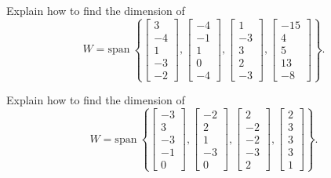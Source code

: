 \documentclass{article}
\begin{document}
\begin{exerciseStatement}
    Explain how to find the dimension of
\[W=\mathrm{span}\ \left\{\left[\begin{array}{r}
3 \\
-4 \\
1 \\
-3 \\
-2
\end{array}\right] , \left[\begin{array}{r}
-4 \\
-1 \\
1 \\
0 \\
-4
\end{array}\right] , \left[\begin{array}{r}
1 \\
-3 \\
3 \\
2 \\
-3
\end{array}\right] , \left[\begin{array}{r}
-15 \\
4 \\
5 \\
13 \\
-8
\end{array}\right]\right\}.\]



  
\end{exerciseStatement}

\begin{exerciseStatement}
    Explain how to find the dimension of
\[W=\mathrm{span}\ \left\{\left[\begin{array}{r}
-3 \\
3 \\
-3 \\
-1 \\
0
\end{array}\right] , \left[\begin{array}{r}
-2 \\
2 \\
1 \\
-3 \\
0
\end{array}\right] , \left[\begin{array}{r}
2 \\
-2 \\
-2 \\
-3 \\
2
\end{array}\right] , \left[\begin{array}{r}
2 \\
3 \\
3 \\
3 \\
1
\end{array}\right]\right\}.\]



  
\end{exerciseStatement}
\end{document}
